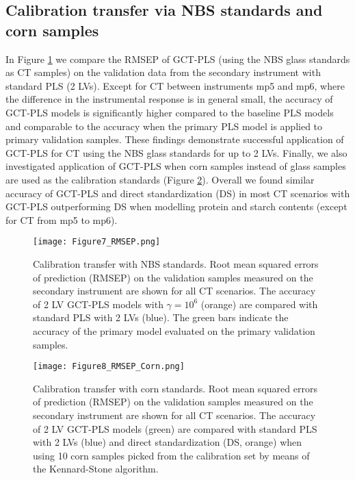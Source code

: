 \documentclass{article}
\begin{document}
\subsection{Calibration transfer via NBS standards and corn samples}
In Figure \ref{fig:figure8} we compare the RMSEP of GCT-PLS (using the NBS glass standards as CT samples) on the validation data from the secondary instrument with standard PLS (2 LVs). Except for CT between instruments mp5 and mp6, where the difference in the instrumental response is in general small, the accuracy of GCT-PLS models is significantly higher compared to the baseline PLS models and comparable to the accuracy when the primary PLS model is applied to primary validation samples. These findings demonstrate successful application of GCT-PLS for CT using the NBS glass standards for up to 2 LVs. Finally, we also investigated application of GCT-PLS when corn samples instead of glass samples are used as the calibration standards (Figure \ref{fig:figure9}). Overall we found similar accuracy of GCT-PLS and direct standardization (DS) in most CT scenarios with GCT-PLS outperforming DS when modelling protein and starch contents (except for CT from mp5 to mp6).  

\begin{figure}[]
	\centering
	\texttt{[image: Figure7\_RMSEP.png]}
	\caption{Calibration transfer with NBS standards. Root mean squared errors of prediction (RMSEP) on the validation samples measured on the secondary instrument are shown for all CT scenarios. The accuracy of 2 LV GCT-PLS models with $\gamma = 10^6$ (orange) are compared with standard PLS with 2 LVs (blue). The green bars indicate the accuracy of the primary model evaluated on the primary validation samples.}
	\label{fig:figure8}
\end{figure}

\begin{figure}[]
	\centering
	\texttt{[image: Figure8\_RMSEP\_Corn.png]}
	\caption{Calibration transfer with corn standards. Root mean squared errors of prediction (RMSEP) on the validation samples measured on the secondary instrument are shown for all CT scenarios. The accuracy of 2 LV GCT-PLS models (green) are compared with standard PLS with 2 LVs (blue) and direct standardization (DS, orange) when using 10 corn samples picked from the calibration set by means of the Kennard-Stone algorithm.}
	\label{fig:figure9}
\end{figure}
\end{document}
